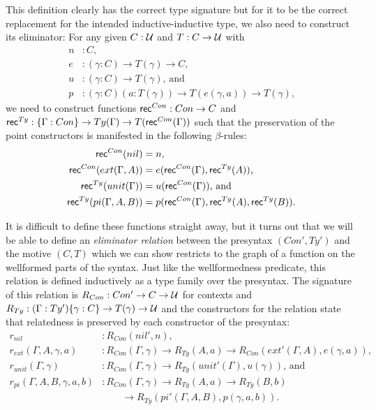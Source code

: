 This definition clearly has the correct type signature but for it to be the correct
replacement for the intended inductive-inductive type,
we also need to construct its eliminator:
For any given $C : \mathcal{U}$ and $T : C \to \mathcal{U}$ with
\begin{align*}
n &: C \text{,} \\
e &: (\gamma : C) \to T(\gamma) \to C \text{,} \\
u &: (\gamma : C) \to T(\gamma) \text{, and} \\
p &: (\gamma : C) (a : T(\gamma)) \to T(e(\gamma, a)) \to T(\gamma) \text{,}
\end{align*}
we need to construct functions $\mathsf{rec}^{Con} : Con \to C$ and 
$\mathsf{rec}^{Ty} : \{\Gamma : Con\} \to Ty(\Gamma) \to T(\mathsf{rec}^{Con}(\Gamma))$ such
that the preservation of the point constructors is manifested in the
following $\beta$-rules:
\begin{align*}
\mathsf{rec}^{Con}(nil)
  &= n \text{,} \\
\mathsf{rec}^{Con}(ext(\Gamma, A))
  &= e(\mathsf{rec}^{Con}(\Gamma), \mathsf{rec}^{Ty}(A)) \text{,} \\
\mathsf{rec}^{Ty}(unit(\Gamma))
  &= u(\mathsf{rec}^{Con}(\Gamma)) \text{, and} \\
\mathsf{rec}^{Ty}(pi(\Gamma, A, B))
  &= p(\mathsf{rec}^{Con}(\Gamma), \mathsf{rec}^{Ty}(A), \mathsf{rec}^{Ty}(B)) \text{.}
\end{align*}

It is difficult to define these functions straight away, but it turns out that
we will be able to define an \emph{eliminator relation} between the presyntax
$(Con', Ty')$ and the motive $(C, T)$ which we can show restricts to the graph
of a function on the wellformed parts of the syntax.
Just like the wellformedness predicate, this relation is defined inductively
as a type family over the presyntax.
The signature of this relation is $R_{Con} : Con' \to C \to \mathcal{U}$ for contexts
and $R_{Ty} : (\Gamma : Ty') \{\gamma : C\} \to T(\gamma) \to \mathcal{U}$ and the
constructors for the relation state that relatedness is preserved by each
constructor of the presyntax:
\begin{align*}
r_{nil} 
  &: R_{Con}(nil', n) \text{,} \\
r_{ext}(\Gamma, A, \gamma, a) 
  &: R_{Con}(\Gamma, \gamma) \to R_{Ty}(A, a)
    \to R_{Con}(ext'(\Gamma, A), e(\gamma, a)) \text{,}\\
r_{unit}(\Gamma, \gamma)
  &: R_{Con}(\Gamma, \gamma) \to R_{Ty}(unit'(\Gamma), u(\gamma)) \text{, and} \\
r_{pi}(\Gamma, A, B, \gamma, a, b)
  &: R_{Con}(\Gamma, \gamma) \to R_{Ty}(A, a) \to R_{Ty}(B, b) \\
  & \qquad \to R_{Ty}(pi'(\Gamma, A, B), p(\gamma, a, b)) \text{.}
\end{align*}

